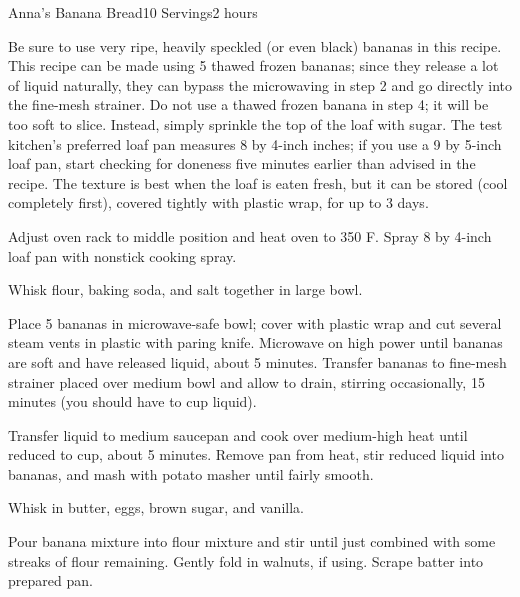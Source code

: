 \documentclass[openany]{book}
\begin{document}
\begin{recipe}{Anna’s Banana Bread}{10 Servings}{2 hours}

\freeform Be sure to use very ripe, heavily speckled (or even black) bananas in this recipe. This recipe can be made using 5 thawed frozen bananas; since they release a lot of liquid naturally, they can bypass the microwaving in step 2 and go directly into the fine-mesh strainer. Do not use a thawed frozen banana in step 4; it will be too soft to slice. Instead, simply sprinkle the top of the loaf with sugar. The test kitchen’s preferred loaf pan measures 8 by 4-inch inches; if you use a 9 by 5-inch loaf pan, start checking for doneness five minutes earlier than advised in the recipe. The texture is best when the loaf is eaten fresh, but it can be stored (cool completely first), covered tightly with plastic wrap, for up to 3 days.

\newstep Adjust oven rack to middle position and heat oven to 350 \0 F. Spray 8 by 4-inch loaf pan with nonstick cooking spray.


Whisk flour, baking soda, and salt together in large bowl.


Place 5 bananas in microwave-safe bowl; cover with plastic wrap and cut several steam vents in plastic with paring knife. Microwave on high power until bananas are soft and have released liquid, about 5 minutes. Transfer bananas to fine-mesh strainer placed over medium bowl and allow to drain, stirring occasionally, 15 minutes (you should have  to  cup liquid).

\newstep Transfer liquid to medium saucepan and cook over medium-high heat until reduced to  cup, about 5 minutes. Remove pan from heat, stir reduced liquid into bananas, and mash with potato masher until fairly smooth. 


Whisk in butter, eggs, brown sugar, and vanilla.


Pour banana mixture into flour mixture and stir until just combined with some streaks of flour remaining. Gently fold in walnuts, if using. Scrape batter into prepared pan. 


\end{recipe}
\end{document}

